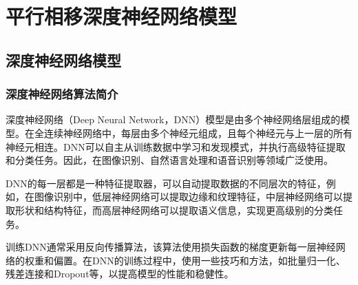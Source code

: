\chapter[平行相移深度神经网络模型]{平行相移深度神经网络模型}
\section{深度神经网络模型}
\subsection{深度神经网络算法简介}
深度神经网络（Deep Neural Network，DNN）模型是由多个神经网络层组成的模型\cite{王珏2006机器学习及其应用}。在全连续神经网络中，每层由多个神经元组成，且每个神经元与上一层的所有神经元相连。DNN可以自主从训练数据中学习和发现模式，并执行高级特征提取和分类任务。因此，在图像识别、自然语言处理和语音识别等领域广泛使用。

DNN的每一层都是一种特征提取器，可以自动提取数据的不同层次的特征，例如，在图像识别中，低层神经网络可以提取边缘和纹理特征，中层神经网络可以提取形状和结构特征，而高层神经网络可以提取语义信息，实现更高级别的分类任务。

训练DNN通常采用反向传播算法\cite{rojas1996backpropagation}，该算法使用损失函数的梯度更新每一层神经网络的权重和偏置。在DNN的训练过程中，使用一些技巧和方法，如批量归一化\cite{deng2014deep}、残差连接和Dropout等\cite{尹宝才2015深度学习研究综述}，以提高模型的性能和稳健性。

